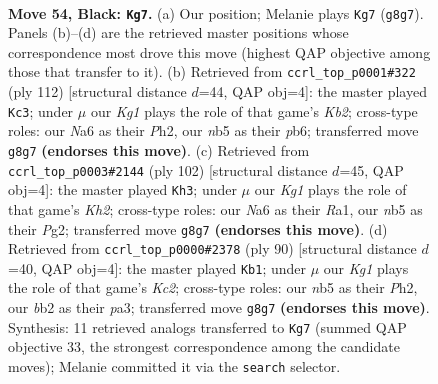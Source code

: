 \documentclass[11pt]{article}
\begin{document}
\clearpage

\begin{figure}[p]\centering
\begin{subfigure}{0.46\textwidth}\centering
\resizebox{\linewidth}{!}{%
\newchessgame
\chessboard[
  setfen={6k1/4p3/npr3pp/pN6/P1p2K2/2P2P2/1B1R4/8 b - - 3 54},
  showmover=false,
  pgfstyle=straightmove, color=movearrow, markmove={g8-g7}
]}
\caption{}
\end{subfigure}\hfill
\begin{subfigure}{0.46\textwidth}\centering
\resizebox{\linewidth}{!}{%
\newchessgame
\chessboard[
  setfen={8/p2k1p2/1p2p1p1/1P2P3/P3R2P/8/1KP4P/5r2 w - - 11 57},
  showmover=false,
  pgfstyle=straightmove, color=movearrow, markmove={b2-c3}
]}
\caption{}
\end{subfigure}
\\[4pt]
\begin{subfigure}{0.46\textwidth}\centering
\resizebox{\linewidth}{!}{%
\newchessgame
\chessboard[
  setfen={2r5/p5p1/3B1p2/1P3k1p/P3p2P/3bP3/6PK/R7 w - - 2 52},
  showmover=false,
  pgfstyle=straightmove, color=movearrow, markmove={h2-h3}
]}
\caption{}
\end{subfigure}\hfill
\begin{subfigure}{0.46\textwidth}\centering
\resizebox{\linewidth}{!}{%
\newchessgame
\chessboard[
  setfen={r7/1p4k1/2p5/2P2R1B/3PnP2/p3P2p/2K4P/8 w - - 1 46},
  showmover=false,
  pgfstyle=straightmove, color=movearrow, markmove={c2-b1}
]}
\caption{}
\end{subfigure}
\caption{\textbf{Move 54, Black: \texttt{Kg7}.} (a) Our position; Melanie plays \texttt{Kg7} (\texttt{g8g7}). Panels (b)--(d) are the retrieved master positions whose correspondence most drove this move (highest QAP objective among those that transfer to it). (b) Retrieved from \texttt{ccrl\_top\_p0001\#322} (ply 112) [structural distance $d$=44, QAP obj=4]: the master played \texttt{Kc3}; under $\mu$ our \emph{Kg1} plays the role of that game's \emph{Kb2}; cross-type roles: our \emph{N}a6 as their \emph{P}h2, our \emph{n}b5 as their \emph{p}b6; transferred move \texttt{g8g7} \textbf{(endorses this move)}. (c) Retrieved from \texttt{ccrl\_top\_p0003\#2144} (ply 102) [structural distance $d$=45, QAP obj=4]: the master played \texttt{Kh3}; under $\mu$ our \emph{Kg1} plays the role of that game's \emph{Kh2}; cross-type roles: our \emph{N}a6 as their \emph{R}a1, our \emph{n}b5 as their \emph{P}g2; transferred move \texttt{g8g7} \textbf{(endorses this move)}. (d) Retrieved from \texttt{ccrl\_top\_p0000\#2378} (ply 90) [structural distance $d$=40, QAP obj=4]: the master played \texttt{Kb1}; under $\mu$ our \emph{Kg1} plays the role of that game's \emph{Kc2}; cross-type roles: our \emph{n}b5 as their \emph{P}h2, our \emph{b}b2 as their \emph{p}a3; transferred move \texttt{g8g7} \textbf{(endorses this move)}. Synthesis: 11 retrieved analogs transferred to \texttt{Kg7} (summed QAP objective 33, the strongest correspondence among the candidate moves); Melanie committed it via the \texttt{search} selector.}
\label{fig:thought-m107}
\end{figure}
\end{document}
